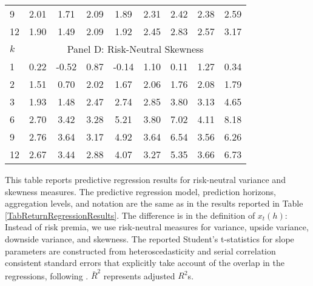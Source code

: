 \documentclass[11pt]{article}
\begin{document}
\begin{table}
\begin{center}
\begin{tabular}{lllllllll}
9 & \multicolumn{1}{c}{2.01} & \multicolumn{1}{c}{1.71} & \multicolumn{1}{c}{2.09} & \multicolumn{1}{c}{1.89} & \multicolumn{1}{c}{2.31} & \multicolumn{1}{c}{2.42} & \multicolumn{1}{c}{2.38} & \multicolumn{1}{c}{2.59} \\
12 & \multicolumn{1}{c}{1.90} & \multicolumn{1}{c}{1.49} & \multicolumn{1}{c}{2.09} & \multicolumn{1}{c}{1.92} & \multicolumn{1}{c}{2.45} & \multicolumn{1}{c}{2.83} & \multicolumn{1}{c}{2.57} & \multicolumn{1}{c}{3.17} \\
\hline
$k$ & \multicolumn{8}{c}{Panel D: Risk-Neutral Skewness} \\
\hline
1 & \multicolumn{1}{c}{0.22} & \multicolumn{1}{c}{-0.52} & \multicolumn{1}{c}{0.87} & \multicolumn{1}{c}{-0.14} & \multicolumn{1}{c}{1.10} & \multicolumn{1}{c}{0.11} & \multicolumn{1}{c}{1.27} & \multicolumn{1}{c}{0.34} \\
2 & \multicolumn{1}{c}{1.51} & \multicolumn{1}{c}{0.70} & \multicolumn{1}{c}{2.02} & \multicolumn{1}{c}{1.67} & \multicolumn{1}{c}{2.06} & \multicolumn{1}{c}{1.76} & \multicolumn{1}{c}{2.08} & \multicolumn{1}{c}{1.79} \\
3 & \multicolumn{1}{c}{1.93} & \multicolumn{1}{c}{1.48} & \multicolumn{1}{c}{2.47} & \multicolumn{1}{c}{2.74} & \multicolumn{1}{c}{2.85} & \multicolumn{1}{c}{3.80} & \multicolumn{1}{c}{3.13} & \multicolumn{1}{c}{4.65} \\
6 & \multicolumn{1}{c}{2.70} & \multicolumn{1}{c}{3.42} & \multicolumn{1}{c}{3.28} & \multicolumn{1}{c}{5.21} & \multicolumn{1}{c}{3.80} & \multicolumn{1}{c}{7.02} & \multicolumn{1}{c}{4.11} & \multicolumn{1}{c}{8.18} \\
9 & \multicolumn{1}{c}{2.76} & \multicolumn{1}{c}{3.64} & \multicolumn{1}{c}{3.17} & \multicolumn{1}{c}{4.92} & \multicolumn{1}{c}{3.64} & \multicolumn{1}{c}{6.54} & \multicolumn{1}{c}{3.56} & \multicolumn{1}{c}{6.26} \\
12 & \multicolumn{1}{c}{2.67} & \multicolumn{1}{c}{3.44} & \multicolumn{1}{c}{2.88} & \multicolumn{1}{c}{4.07} & \multicolumn{1}{c}{3.27} & \multicolumn{1}{c}{5.35} & \multicolumn{1}{c}{3.66} & \multicolumn{1}{c}{6.73} \\
\hline
\end{tabular}
  \end{center}
  \noindent\scriptsize This table reports predictive regression results for risk-neutral variance and skewness measures. The predictive regression model, prediction horizons, aggregation levels, and notation are the same as in the results reported in Table \ref{TabReturnRegressionResults}. The difference is in the definition of $x_t(h)$: Instead of risk premia, we use risk-neutral measures for variance, upside variance, downside variance, and skewness. The reported Student's t-statistics for slope parameters are constructed from heteroscedasticity and serial correlation consistent standard errors that explicitly take account of the overlap in the regressions, following \cite{Hodrick92RFS}. $\bar{R}^2$ represents adjusted $R^2$s.

\end{table}
\end{document}
